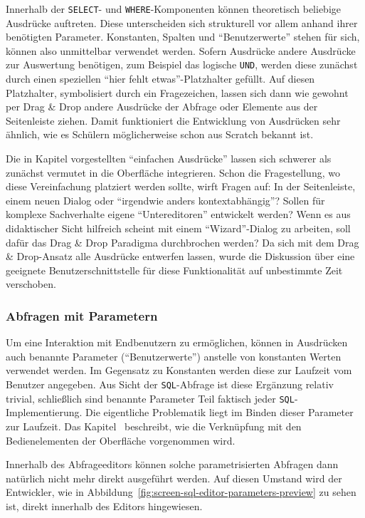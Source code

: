 Innerhalb der \texttt{SELECT}- und \texttt{WHERE}-Komponenten können theoretisch beliebige Ausdrücke auftreten. Diese unterscheiden sich strukturell vor allem anhand ihrer benötigten Parameter. Konstanten, Spalten und "`Benutzerwerte"' stehen für sich, können also unmittelbar verwendet werden. Sofern Ausdrücke andere Ausdrücke zur Auswertung benötigen, zum Beispiel das logische \texttt{UND}, werden diese zunächst durch einen speziellen "`hier fehlt etwas"'-Platzhalter gefüllt. Auf diesen Platzhalter, symbolisiert durch ein Fragezeichen, lassen sich dann wie gewohnt per Drag \& Drop andere Ausdrücke der Abfrage oder Elemente aus der Seitenleiste ziehen. Damit funktioniert die Entwicklung von Ausdrücken sehr ähnlich, wie es Schülern möglicherweise schon aus Scratch bekannt ist.

Die in Kapitel  vorgestellten "`einfachen Ausdrücke"' lassen sich schwerer als zunächst vermutet in die Oberfläche integrieren. Schon die Fragestellung, wo diese Vereinfachung platziert werden sollte, wirft Fragen auf: In der Seitenleiste, einem neuen Dialog oder "`irgendwie anders kontextabhängig"'? Sollen für komplexe Sachverhalte eigene "`Untereditoren"' entwickelt werden? Wenn es aus didaktischer Sicht hilfreich scheint mit einem "`Wizard"'-Dialog zu arbeiten, soll dafür das Drag \& Drop Paradigma durchbrochen werden? Da sich mit dem Drag \& Drop-Ansatz alle Ausdrücke entwerfen lassen, wurde die Diskussion über eine geeignete Benutzerschnittstelle für diese Funktionalität auf unbestimmte Zeit verschoben.

\subsubsection{Abfragen mit Parametern}
\label{sec:design-query-params}

Um eine Interaktion mit Endbenutzern zu ermöglichen, können in Ausdrücken auch benannte Parameter ("`Benutzerwerte"') anstelle von konstanten Werten verwendet werden. Im Gegensatz zu Konstanten werden diese zur Laufzeit vom Benutzer angegeben. Aus Sicht der \texttt{SQL}-Abfrage ist diese Ergänzung relativ trivial, schließlich sind benannte Parameter Teil faktisch jeder \texttt{SQL}-Implementierung. Die eigentliche Problematik liegt im Binden dieser Parameter zur Laufzeit. Das Kapitel~ beschreibt, wie die Verknüpfung mit den Bedienelementen der Oberfläche vorgenommen wird.

Innerhalb des Abfrageeditors können solche parametrisierten Abfragen dann natürlich nicht mehr direkt ausgeführt werden. Auf diesen Umstand wird der Entwickler, wie in Abbildung~\ref{fig:screen-sql-editor-parameters-preview} zu sehen ist, direkt innerhalb des Editors hingewiesen.

